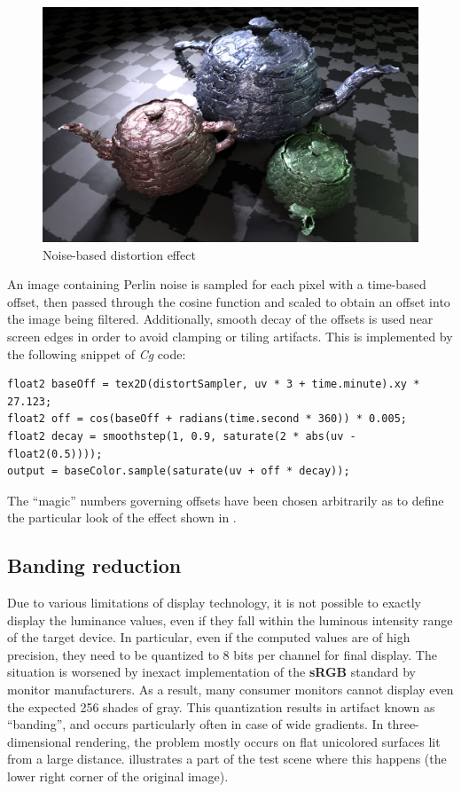 \begin{figure}[ht!]
  \centering
    \includegraphics[width=0.9\linewidth]{./Figures/postProc/distortion.jpg}
    \caption[Distortion]{Noise-based distortion effect}
  \label{fig:postProcDistortion}
\end{figure}

An image containing Perlin noise is sampled for each pixel with a time-based offset, then passed through the cosine function and scaled to obtain an offset into the image being filtered. Additionally, smooth decay of the offsets is used near screen edges in order to avoid clamping or tiling artifacts. This is implemented by the following snippet of \emph{Cg} code:

\noindent\begin{minipage}{\textwidth}
\begin{lstlisting}[frame=single]
float2 baseOff = tex2D(distortSampler, uv * 3 + time.minute).xy * 27.123;
float2 off = cos(baseOff + radians(time.second * 360)) * 0.005;
float2 decay = smoothstep(1, 0.9, saturate(2 * abs(uv - float2(0.5))));
output = baseColor.sample(saturate(uv + off * decay));
\end{lstlisting}
\end{minipage}

The ``magic'' numbers governing offsets have been chosen arbitrarily as to define the particular look of the effect shown in .

\subsection{Banding reduction}

Due to various limitations of display technology, it is not possible to exactly display the luminance values, even if they fall within the luminous intensity range of the target device. In particular, even if the computed values are of high precision, they need to be quantized to 8 bits per channel for final display. The situation is worsened by inexact implementation of the \textbf{sRGB} standard by monitor manufacturers. As a result, many consumer monitors cannot display even the expected 256 shades of gray. This quantization results in artifact known as ``banding'', and occurs particularly often in case of wide gradients. In three-dimensional rendering, the problem mostly occurs on flat unicolored surfaces lit from a large distance.  illustrates a part of the test scene where this happens (the lower right corner of the original image).

